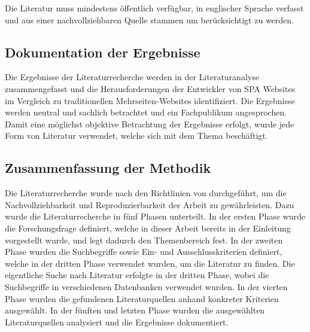 Die Literatur muss mindestens öffentlich verfügbar, in englischer Sprache verfasst und aus einer nachvollziehbaren Quelle stammen um berücksichtigt zu werden.


\subsection{Dokumentation der Ergebnisse}
Die Ergebnisse der Literaturrecherche werden in der Literaturanalyse zusammengefasst und die Herausforderungen der Entwickler von \ac{SPA} Websites im Vergleich zu traditionellen Mehrseiten-Websites identifiziert.
Die Ergebnisse werden neutral und sachlich betrachtet und ein Fachpublikum angesprochen.
Damit eine möglichst objektive Betrachtung der Ergebnisse erfolgt, wurde jede Form von Literatur verwendet, welche sich mit dem Thema beschäftigt.

\subsection*{Zusammenfassung der Methodik}
Die Literaturrecherche wurde nach den Richtlinien von \citeauthor{conf/ecis/BrockeSNRPC09} durchgeführt, um die Nachvollziehbarkeit und Reproduzierbarkeit der Arbeit zu gewährleisten.
Dazu wurde die Literaturrecherche in fünf Phasen unterteilt.
In der ersten Phase wurde die Forschungsfrage definiert, welche in dieser Arbeit bereits in der Einleitung vorgestellt wurde, und legt dadurch den Themenbereich fest.
In der zweiten Phase wurden die Suchbegriffe sowie Ein- und Ausschlusskriterien definiert, welche in der dritten Phase verwendet wurden, um die Literatur zu finden.
Die eigentliche Suche nach Literatur erfolgte in der dritten Phase, wobei die Suchbegriffe in verschiedenen Datenbanken verwendet wurden.
In der vierten Phase wurden die gefundenen Literaturquellen anhand konkreter Kriterien ausgewählt.
In der fünften und letzten Phase wurden die ausgewählten Literaturquellen analysiert und die Ergebnisse dokumentiert.